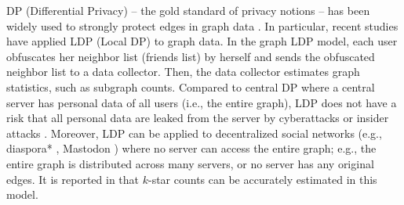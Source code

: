 DP (Differential Privacy) \cite{Dwork_ICALP06,DP} -- the gold standard of privacy notions -- has been widely used to strongly protect edges in graph data \cite{Day_SIGMOD16,Ding_TKDE21,Hay_ICDM09,Imola_USENIX21,Imola_USENIX22,Karwa_PVLDB11,Kasiviswanathan_TCC13,Qin_CCS17,Sun_CCS19,Ye_ICDE20,Ye_TKDE21}. 
In particular, recent studies 
\cite{Imola_USENIX21,Imola_USENIX22,Qin_CCS17,Ye_ICDE20,Ye_TKDE21} 
have applied LDP (Local DP) \cite{Kasiviswanathan_FOCS08} to 
graph data. 
In the graph LDP model, each user obfuscates her neighbor list (friends list) by herself and sends the obfuscated neighbor list to a data collector. 
Then, the data collector estimates graph statistics, such as subgraph counts. 
Compared to central DP where a central server has personal data of all users (i.e., the entire graph), LDP does not have a risk that all personal data are leaked from the server by 
cyberattacks 
\cite{Henriquez_breach2021} or insider attacks \cite{Kohen_insider_threats}. 
Moreover, LDP can be applied to decentralized social networks \cite{Paul_CN14,Salve_CSR18} (e.g., diaspora* \cite{Diaspora}, Mastodon \cite{Mastodon}) where no server can access the entire graph; e.g., 
the entire graph is distributed across many servers, or no server has any original edges. 
It is reported in \cite{Imola_USENIX21} that $k$-star counts can be accurately estimated in this model. 

